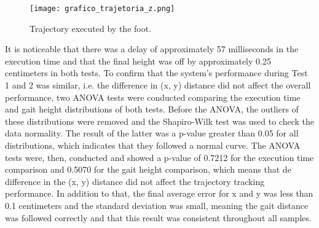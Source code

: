 \documentclass[conference]{IEEEtran}
\begin{document}
\begin{table}[!b]
  \centering
  \caption{Results of the gait trajectory tracking experiment.}
  \vspace{-\baselineskip}
  \label{tab:trajetoria}
\end{table}

\begin{figure}[!b]
  \centering
  \texttt{[image: grafico\_trajetoria\_z.png]}
  \caption{Trajectory executed by the foot.}
  \label{fig:grafico_trajetoria_xyz}
\end{figure}
\vspace{-\baselineskip}

It is noticeable that there was a delay of approximately 57 milliseconds in the execution time and that the final height was off by approximately 0.25 centimeters in both tests. To confirm that the system's performance during Test 1 and 2 was similar, i.e. the difference in (x, y) distance did not affect the overall performance, two ANOVA \cite{cano2012six} tests were conducted comparing the execution time and gait height distributions of both tests. Before the ANOVA, the outliers of these distributions were removed and the Shapiro-Wilk \cite{leotti2005comparaccao} test was used to check the data normality. The result of the latter was a p-value greater than 0.05 for all distributions, which indicates that they followed a normal curve. The ANOVA tests were, then, conducted and showed a p-value of 0.7212 for the execution time comparison and 0.5070 for the gait height comparison, which means that de difference in the (x, y) distance did not affect the trajectory tracking performance. In addition to that, the final average error for x and y was less than 0.1 centimeters and the standard deviation was small, meaning the gait distance was followed correctly and that this result was consistent throughout all samples.
\end{document}
